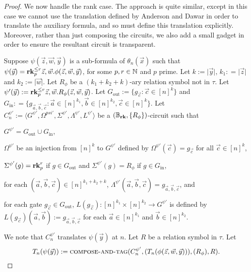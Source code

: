 \documentclass[../paper.tex]{subfiles}
\begin{document}
\begin{proof}
  We now handle the rank case. The approach is quite similar, except in this
  case we cannot use the translation defined by Anderson and Dawar in order to
  translate the auxiliary formula, and so must define this translation
  explicitly. Moreover, rather than just composing the circuits, we also add a
  small gadget in order to ensure the resultant circuit is transparent.
  
  Suppose $\psi(\vec{z}, \vec{w}, \vec{y})$ is a sub-formula of
  $\theta_n(\vec{x})$ such that $\psi (\vec{y}) = \text{\textbf{rk}}^{\leq r}_p \vec{z},
  \vec{w} .\phi(\vec{z}, \vec{w}, \vec{y})$, for some $p, r \in \mathbb{N}$ and $p$
  prime. Let $k:= \vert \vec{y} \vert$, $k_1 : = \vert \vec{z} \vert$ and $k_2
  := \vert \vec{w} \vert$. Let $R_\phi$ be a $(k_1 + k_2 + k)$-ary relation
  symbol not in $\tau$. Let $\psi'(\vec{y}) := \text{\textbf{rk}}^{\leq r}_p\vec{z}, \vec{w}.
  R_{\phi} (\vec{z}, \vec{w}, \vec{y})$. Let $G_{\text{out}} := \{g_{\vec{c}} :
  \vec{c} \in [n]^k\}$ and $G_{\text{in}} : = \{ g_{\vec{a}, \vec{b}, \vec{c}} :
  \vec{a} \in [n]^{k_1}, \vec{b} \in [n]^{k_2}, \vec{c} \in [n]^{k}\}$. Let
  $C^{\psi'}_n:= \langle G^{\psi'}, \Omega^{psi'}, \Sigma^{\psi'},
  \Lambda^{\psi'}, L^{\psi'}\rangle$ be a $(\mathbb{B}_{\text{\textbf{rk}}}, \{ R_{\phi}
  \})$-circuit such that
  \begin{itemizens}
  \item $G^{\psi'} = G_{\text{out}} \cup G_{\text{in}}$,
  \item $\Omega^{\psi'}$ be an injection from $[n]^k$ to $G^{\psi'}$ defined by
    $\Omega^{\psi'}(\vec{c}) = g_{\vec{c}}$ for all $\vec{c} \in [n]^k$,
  \item $\Sigma^{\psi'} (g) = \text{\textbf{rk}}^r_p$ if $g \in G_{\text{out}}$ and
    $\Sigma^{\psi'}(g) = R_\phi$ if $g \in G_{\text{in}}$,
  \item for each $(\vec{a}, \vec{b}, \vec{c}) \in [n]^{k_1 +k_2 + k}$,
    $\Lambda^{\psi'} (\vec{a}, \vec{b}, \vec{c}) = g_{\vec{a}, \vec{b},
      \vec{c}}$, and
  \item for each gate $g_{\vec{c}} \in G_{\text{out}}$, $L(g_{\vec{c}}):
    [n]^{k_1} \times [n]^{k_2} \rightarrow G^{\psi'}$ is defined by
    $L(g_{\vec{c}})(\vec{a}, \vec{b}) := g_{\vec{a}, \vec{b}, \vec{c}}$ for each
    $\vec{a} \in [n]^{k_1}$ and $\vec{b} \in [n]^{k_2}$.
  \end{itemizens}

  We note that $C^{\psi'}_n$ translates $\psi (\vec{y})$ at $n$. Let $R$ be a
  relation symbol in $\tau$. Let
  \begin{align*} T_n(\psi(\vec{y})) := {\normalfont\textsc{compose-and-tag}}(C^{\psi'}_n,
    (T_n(\phi(\vec{z}, \vec{w}, \vec{y}))), (R_\phi), R).
  \end{align*}


\end{proof}
\end{document}
